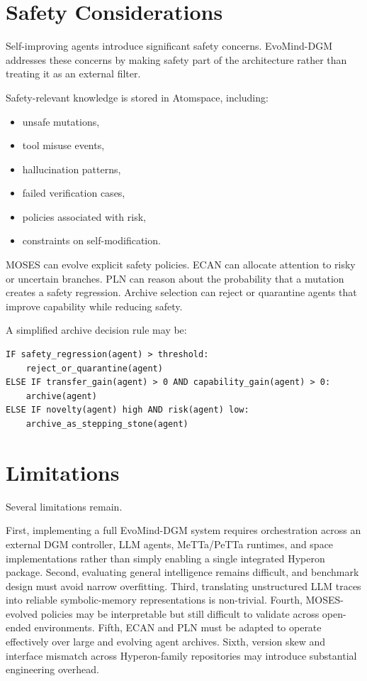 \documentclass[11pt]{article}
\begin{document}
\section{Safety Considerations}

Self-improving agents introduce significant safety concerns. EvoMind-DGM addresses these concerns by making safety part of the architecture rather than treating it as an external filter.

Safety-relevant knowledge is stored in Atomspace, including:

\begin{itemize}[leftmargin=*]
    \item unsafe mutations,
    \item tool misuse events,
    \item hallucination patterns,
    \item failed verification cases,
    \item policies associated with risk,
    \item constraints on self-modification.
\end{itemize}

MOSES can evolve explicit safety policies. ECAN can allocate attention to risky or uncertain branches. PLN can reason about the probability that a mutation creates a safety regression. Archive selection can reject or quarantine agents that improve capability while reducing safety.

A simplified archive decision rule may be:

\begin{verbatim}
IF safety_regression(agent) > threshold:
    reject_or_quarantine(agent)
ELSE IF transfer_gain(agent) > 0 AND capability_gain(agent) > 0:
    archive(agent)
ELSE IF novelty(agent) high AND risk(agent) low:
    archive_as_stepping_stone(agent)
\end{verbatim}

\section{Limitations}

Several limitations remain.

First, implementing a full EvoMind-DGM system requires orchestration across an external DGM controller, LLM agents, MeTTa/PeTTa runtimes, and space implementations rather than simply enabling a single integrated Hyperon package. Second, evaluating general intelligence remains difficult, and benchmark design must avoid narrow overfitting. Third, translating unstructured LLM traces into reliable symbolic-memory representations is non-trivial. Fourth, MOSES-evolved policies may be interpretable but still difficult to validate across open-ended environments. Fifth, ECAN and PLN must be adapted to operate effectively over large and evolving agent archives. Sixth, version skew and interface mismatch across Hyperon-family repositories may introduce substantial engineering overhead.
\end{document}
